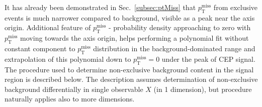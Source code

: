 It has already been demonstrated in Sec.~\ref{subsec:ptMiss} that $p_{\text{T}}^{\text{miss}}$ from exclusive events is much narrower compared to background, visible as a peak near the axis origin. Additional feature of 
$p_{\text{T}}^{\text{miss}}$ - probability density approaching to zero with $p_{\text{T}}^{\text{miss}}$ moving towards the axis origin, helps performing a polynomial fit without constant component to $p_{\text{T}}^{\text{miss}}$ distribution in the background-dominated range and extrapolation of this polynomial down to $p_{\text{T}}^{\text{miss}} = 0$ under the peak of CEP signal. The procedure used to determine non-exclusive background content in the signal region is described below. The description assumes determination of non-exclusive background differentially in single observable $X$ (in 1 dimension), but procedure naturally applies also to more dimensions.

